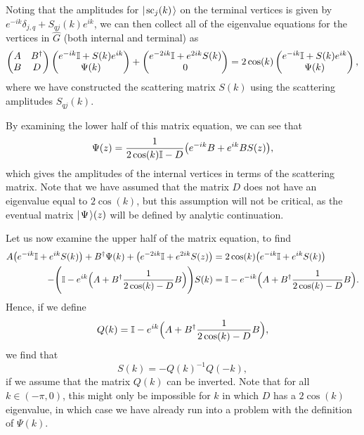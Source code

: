 \documentclass[../thesis-main/thesis-main]{subfiles}
\begin{document}
Noting that the amplitudes for $|\mspace{2mu} \text{sc}_j(k) \mspace{2mu} \rangle$ on the terminal vertices is given by $ e^{-i k}\delta_{j,q} + S_{qj}(k)e^{ik}$, we can then collect all of the eigenvalue equations for the vertices in $\widehat{G}$ (both internal and terminal) as
\begin{equation}
  \begin{pmatrix} A & B^\dag \\
    B & D\end{pmatrix} \begin{pmatrix}  e^{-i k} \mathbb{I} + S(k) e^{i k}\\ \Psi(k)\end{pmatrix} 
    + \begin{pmatrix} e^{-2 i k} \mathbb{I} + e^{2 i k} S(k)\\ 0\end{pmatrix} = 
    2 \cos(k) \begin{pmatrix}  e^{-i k} \mathbb{I} + S(k) e^{i k}\\ \Psi(k)\end{pmatrix},
\end{equation}
where we have constructed the scattering matrix $S(k)$ using the scattering amplitudes $S_{qj}(k)$.

By examining the lower half of this matrix equation, we can see that
\begin{equation}
  \Psi(z) = \frac{1}{2 \cos(k) \mathbb{I} - D} \big( e^{-ik} B + e^{i k} B S(z)\big),
\end{equation}
which gives the amplitudes of the internal vertices in terms of the scattering matrix.  Note that we have assumed that the matrix $D$ does not have an eigenvalue equal to $2\cos(k)$, but this assumption will not be critical, as the eventual matrix $|\mspace{2mu} \Psi \mspace{2mu} \rangle(z)$ will be defined by analytic continuation.

Let us now examine the upper half of the matrix equation, to find
\begin{align}
  A\big(e^{-ik} \mathbb{I}+ e^{i k} S(k)\big) + B^\dag \Psi(k) + \big(e^{-2 ik}\mathbb{I} + e^{2 i k} S(z)\big) &= 2 \cos(k) \big(e^{-ik} \mathbb{I} + e^{i k} S(k)\big)\\
  -\Bigg(\mathbb{I} - e^{ik}\Big(A + B^\dag \frac{1}{2 \cos(k) - D} B\Big)\Bigg)S(k) &= \mathbb{I} - e^{-ik}\Big(A + B^\dag \frac{1}{2 \cos(k) - D} B\Big).
\end{align}
Hence, if we define
\begin{equation}
  Q(k) = \mathbb{I} - e^{ik}\Big( A + B^\dag \frac{1}{2 \cos(k) - D} B\Big),
\end{equation}
we find that
\begin{equation}
  S(k) = - Q(k)^{-1} Q(-k),
\end{equation}
if we assume that the matrix $Q(k)$ can be inverted.  Note that for all ${k\in (-\pi,0)}$, this might only be impossible for $k$ in which $D$ has a $2\cos(k)$ eigenvalue, in which case we have already run into a problem with the definition of $\Psi(k)$.
\end{document}
